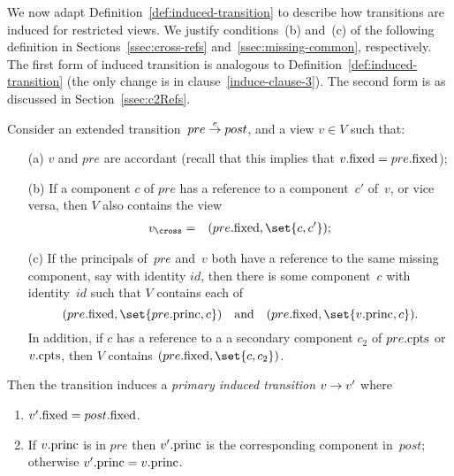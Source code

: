 We now adapt Definition~\ref{def:induced-transition} to describe how
transitions are induced for restricted views.  We justify conditions~(b)
and~(c) of the following definition in Sections~\ref{ssec:cross-refs}
and~\ref{ssec:missing-common}, respectively.  The first form of induced
transition is analogous to Definition~\ref{def:induced-transition} (the only
change is in clause~\ref{induce-clause-3}).  The second form is as discussed
in Section~\ref{ssec:c2Refs}.
%
\begin{definition}
\label{def:induced-transition-singleRef}
Consider an extended transition~$pre \stackrel{e}\rightarrow post$, and a view $v \in V$
such that:
%
\begin{enumerate}
\item[(a)] $v$ and $pre$ are accordant (recall that this implies that
  $v.\mathrm{fixed} = pre.\mathrm{fixed}$);

\item[(b)] If a component $c$ of $pre$ has a reference to a component~$c'$
  of~$v$, or vice versa, then $V$ also contains the view
\begin{eqnarray*}
v_\cross & = & (pre.\fixed, \set{c, c'});
\end{eqnarray*}

\item[(c)] If the principals of~$pre$ and~$v$ both have a reference to the
  same missing component, say with identity $id$, then there is some
  component~$c$ with identity~$id$ such that $V$ contains each of
\[
(pre.\fixed, \set{pre.\princ, c}) \quad\mbox{and}\quad 
(pre.\fixed, \set{v.\princ, c}) .
\]
In addition, if $c$ has a reference to a a secondary component $c_2$ of
$pre.\mathrm{cpts}$ or $v.\mathrm{cpts}$, then $V$ contains $(pre.\fixed, \set{c, c_2})$.
\end{enumerate}
%
Then
the transition induces a \emph{primary induced transition} $v \stackrel{}\rightarrow v'$ where
\begin{enumerate}
\item $v'.\mathrm{fixed} = post.\mathrm{fixed}$.

\item If $v.\mathrm{princ}$ is in $pre$ then $v'.\mathrm{princ}$ is the corresponding
  component in~$post$; otherwise $v'.\mathrm{princ} = v.\mathrm{princ}$.



\end{enumerate}
\end{definition}

